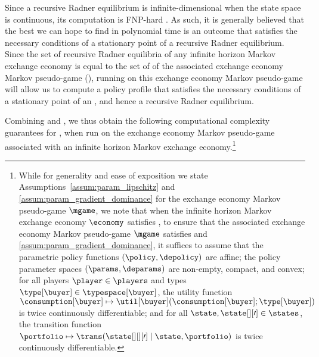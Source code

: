 {%

Since a recursive Radner equilibrium 
is infinite-dimensional when the state space is continuous, its computation is FNP-hard \cite{murty1987some}. 
As such, it is generally believed that the best we can hope to find in polynomial time is an outcome that satisfies the necessary conditions of a stationary point of a recursive Radner equilibrium. 
Since the set of recursive Radner equilibria of any infinite horizon Markov exchange economy is equal to the set of \MPGNE{} of the associated exchange economy Markov pseudo-game (), running  on this exchange economy Markov pseudo-game will allow us to compute a policy profile that satisfies the necessary conditions of a stationary point of an \MPGNE, and hence a recursive Radner equilibrium.

Combining  and , we thus obtain the following computational complexity guarantees for , when run on the exchange economy Markov pseudo-game associated with an infinite horizon Markov exchange economy.\footnote{While for generality and ease of exposition we state Assumptions~\ref{assum:param_lipschitz} and \ref{assum:param_gradient_dominance} for the exchange economy Markov pseudo-game $\mgame$, we note that when the infinite horizon Markov exchange economy $\economy$ satisfies , to ensure that the associated exchange economy Markov pseudo-game $\mgame$ satisfies  and \ref{assum:param_gradient_dominance}, 
it suffices to assume that the parametric policy functions $(\policy, \depolicy)$ are affine; 
the policy parameter spaces $(\params, \deparams)$ are non-empty, compact, and convex; 
for all players $\player \in \players$ and types $\type[\buyer] \in \typespace[\buyer]$, the utility function $\consumption[\buyer] \mapsto\util[\buyer] (\consumption[\buyer]; \type[\buyer])$ is twice continuously differentiable;
and for all $\state, \state[][\prime] \in \states$, the transition function $\portfolio \mapsto\trans(\state[][][\prime] \mid \state, \portfolio)$ is twice continuously differentiable.}

}
